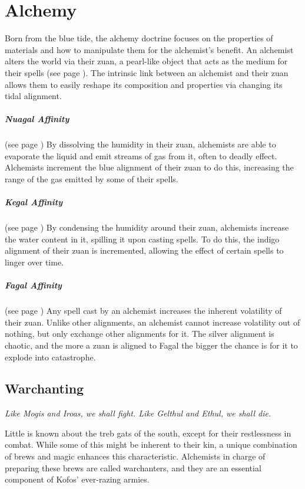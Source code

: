 \section{Alchemy} \label{sec::alchemy}
Born from the blue tide, the alchemy doctrine focuses on the properties of materials and how to manipulate them for the alchemist's benefit.
An alchemist alters the world via their zuan, a pearl-like object that acts as the medium for their spells (see page \pageref{item::zuan}).
The intrinsic link between an alchemist and their zuan allows them to easily reshape its composition and properties via changing its tidal alignment.

\subparagraph{Nuagal Affinity}
    (see page \pageref{medium::dissolve})
    By dissolving the humidity in their zuan, alchemists are able to evaporate the liquid and emit streams of gas from it, often to deadly effect.
    Alchemists increment the blue alignment of their zuan to do this, increasing the range of the gas emitted by some of their spells.

\subparagraph{Kegal Affinity}
    (see page \pageref{medium::condense})
    By condensing the humidity around their zuan, alchemists increase the water content in it, spilling it upon casting spells.
    To do this, the indigo alignment of their zuan is incremented, allowing the effect of certain spells to linger over time.

\subparagraph{Fagal Affinity}
    (see page \pageref{medium::volatilize})
    Any spell cast by an alchemist increases the inherent volatility of their zuan.
    Unlike other alignments, an alchemist cannot increase volatility out of nothing, but only exchange other alignments for it.
    The silver alignment is chaotic, and the more a zuan is aligned to Fagal the bigger the chance is for it to explode into catastrophe.

\subsection*{Warchanting} \label{ssec::warchanting}
    \textit{Like Mogis and Iroas, we shall fight.
    Like Gelthul and Ethul, we shall die.}

    Little is known about the treb gats of the south, except for their restlessness in combat.
    While some of this might be inherent to their kin, a unique combination of brews and magic enhances this characteristic.
    Alchemists in charge of preparing these brews are called warchanters, and they are an essential component of Kofos' ever-razing armies.

